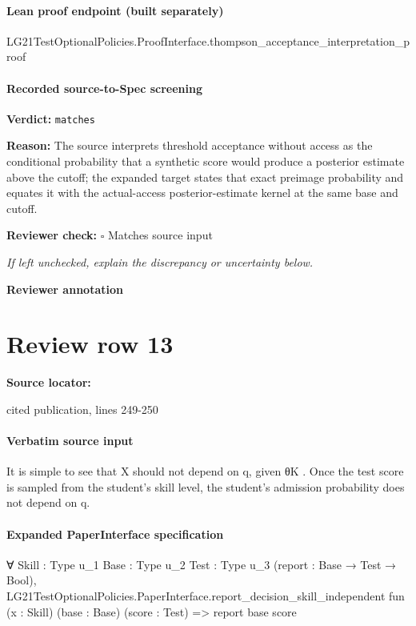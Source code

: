 \documentclass[10pt]{article}
\newcommand{\reviewerbox}{%
  \par\noindent\fbox{\parbox{0.96\linewidth}{\rule{0pt}{0.38in}}}\par
}
\newcommand{\reviewmatch}[1]{%
  \par\noindent\textbf{Reviewer check:} $\square$\; #1\par
  \noindent\emph{If left unchecked, explain the discrepancy or uncertainty below.}\par
}
\begin{document}
\paragraph{Lean proof endpoint (built separately)}\begin{ReviewVerbatim}
LG21TestOptionalPolicies.ProofInterface.thompson_acceptance_interpretation_proof
\end{ReviewVerbatim}

\paragraph{Recorded source-to-Spec screening}
\textbf{Verdict:} \texttt{matches}
\\
{\raggedright
\textbf{Reason:} The source interprets threshold acceptance without access as the conditional probability that a synthetic score would produce a posterior estimate above the cutoff;\allowbreak{} the expanded target states that exact preimage probability and equates it with the actual-\allowbreak{}access posterior-\allowbreak{}estimate kernel at the same base and cutoff.\allowbreak{}
\par}
\reviewmatch{Matches source input}
\noindent\textbf{Reviewer annotation}\par
\reviewerbox
\clearpage
\hypertarget{source-claim-4fde92dc99817f62}{}
\section*{Review row 13}
\textbf{Source locator:} {\footnotesize\raggedright cited publication, lines 249-\allowbreak{}250\par}
\paragraph{Verbatim source input}
\begin{ReviewVerbatim}
It is simple to see that X should not depend on q, given θK . Once the test score is sampled from the student’s
skill level, the student’s admission probability does not depend on q.
\end{ReviewVerbatim}



\paragraph{Expanded PaperInterface specification}
\begin{ReviewVerbatim}
∀ {Skill : Type u_1} {Base : Type u_2} {Test : Type u_3} (report : Base → Test → Bool),
  LG21TestOptionalPolicies.PaperInterface.report_decision_skill_independent
    fun (x : Skill) (base : Base) (score : Test) => report base score
\end{ReviewVerbatim}
\end{document}
